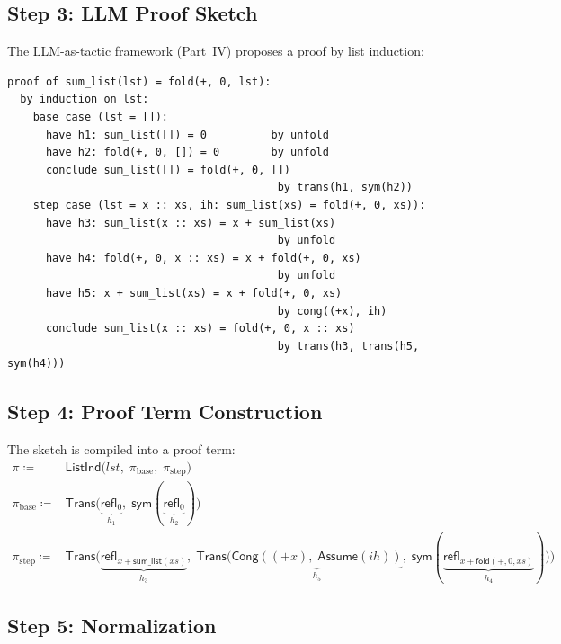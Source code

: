 \documentclass[11pt,a4paper]{report}
\theoremstyle{definition}
\theoremstyle{plain}
\newcommand{\Refl}{\mathsf{refl}}
\newcommand{\sym}{\mathsf{sym}}
\newcommand{\Assume}{\mathsf{Assume}}
\newcommand{\Trans}{\mathsf{Trans}}
\newcommand{\Cong}{\mathsf{Cong}}
\newcommand{\defeq}{\coloneqq}
\begin{document}
\subsection{Step 3: LLM Proof Sketch}

The LLM-as-tactic framework (Part~IV) proposes a proof by list induction:
\begin{lstlisting}[style=proof]
proof of sum_list(lst) = fold(+, 0, lst):
  by induction on lst:
    base case (lst = []):
      have h1: sum_list([]) = 0          by unfold
      have h2: fold(+, 0, []) = 0        by unfold
      conclude sum_list([]) = fold(+, 0, [])
                                          by trans(h1, sym(h2))
    step case (lst = x :: xs, ih: sum_list(xs) = fold(+, 0, xs)):
      have h3: sum_list(x :: xs) = x + sum_list(xs)
                                          by unfold
      have h4: fold(+, 0, x :: xs) = x + fold(+, 0, xs)
                                          by unfold
      have h5: x + sum_list(xs) = x + fold(+, 0, xs)
                                          by cong((+x), ih)
      conclude sum_list(x :: xs) = fold(+, 0, x :: xs)
                                          by trans(h3, trans(h5, sym(h4)))
\end{lstlisting}

\subsection{Step 4: Proof Term Construction}

The sketch is compiled into a proof term:
\begin{align*}
  \pi \defeq{} & \mathsf{ListInd}\bigl(\mathit{lst},\; \pi_{\mathrm{base}},\;
    \pi_{\mathrm{step}}\bigr) \\
  \pi_{\mathrm{base}} \defeq{} & \Trans\bigl(\underbrace{\Refl_0}_{h_1},\;
    \sym(\underbrace{\Refl_0}_{h_2})\bigr) \\
  \pi_{\mathrm{step}} \defeq{} & \Trans\bigl(
    \underbrace{\Refl_{x + \mathsf{sum\_list}(xs)}}_{h_3},\;
    \Trans\bigl(
      \underbrace{\Cong((+x),\; \Assume(\mathit{ih}))}_{h_5},\;
      \sym(\underbrace{\Refl_{x + \mathsf{fold}(+,0,xs)}}_{h_4})
    \bigr)
  \bigr)
\end{align*}

\subsection{Step 5: Normalization}
\end{document}
